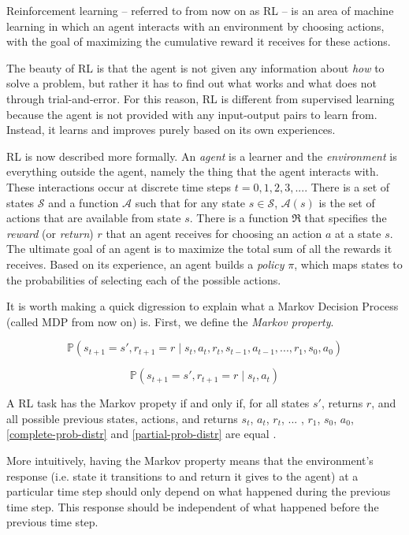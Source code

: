 \documentclass[11pt,a4paper]{report}
\begin{document}
Reinforcement learning -- referred to from now on as RL -- is an area of machine learning in which an agent interacts with an environment by choosing actions, with the goal of maximizing the cumulative reward it receives for these actions.

The beauty of RL is that the agent is not given any information about \emph{how} to solve a problem, but rather it has to find out what works and what does not through trial-and-error. For this reason, RL is different from supervised learning because the agent is not provided with any input-output pairs to learn from. Instead, it learns and improves purely based on its own experiences.

RL is now described more formally. An \emph{agent} is a learner and the \emph{environment} is everything outside the agent, namely the thing that the agent interacts with. These interactions occur at discrete time steps $t = 0, 1, 2, 3, ...$. There is a set of states $\mathcal{S}$ and a function $\mathcal{A}$ such that for any state $s \in \mathcal{S}$, $\mathcal{A}(s)$ is the set of actions that are available from state $s$. There is a function $\mathfrak{R}$ that specifies the \emph{reward} (or \emph{return}) $r$ that an agent receives for choosing an action $a$ at a state $s$. The ultimate goal of an agent is to maximize the total sum of all the rewards it receives. Based on its experience, an agent builds a \emph{policy} $\pi$, which maps states to the probabilities of selecting each of the possible actions.

It is worth making a quick digression to explain what a Markov Decision Process (called MDP from now on) is. First, we define the \emph{Markov property}.

\begin{equation}
	\mathbb{P}(s_{t+1} = s', r_{t+1} = r \mid s_t, a_t, r_t, s_{t-1}, a_{t-1}, ... , r_1, s_0, a_0)
 \label{complete-prob-distr}
\end{equation}

\begin{equation}
	\mathbb{P}(s_{t+1} = s', r_{t+1} = r \mid s_t, a_t) \label{partial-prob-distr}
\end{equation}

A RL task has the Markov propety if and only if, for all states $s'$, returns $r$, and all possible previous states, actions, and returns $s_t$, $a_t$, $r_t$, ... , $r_1$, $s_0$, $a_0$, \ref{complete-prob-distr} and \ref{partial-prob-distr} are equal \cite{rl-book}.

More intuitively, having the Markov property means that the environment's response (i.e. state it transitions to and return it gives to the agent) at a particular time step should only depend on what happened during the previous time step. This response should be independent of what happened before the previous time step.
\end{document}
